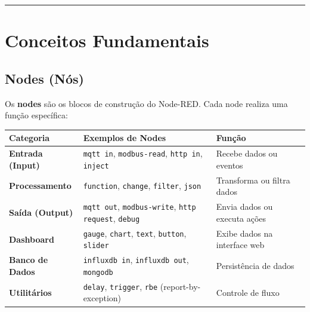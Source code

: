 \begin{center}\rule{0.5\linewidth}{0.5pt}\end{center}

\section{Conceitos Fundamentais}\label{conceitos-fundamentais}

\subsection{Nodes (Nós)}\label{nodes-nuxf3s}

Os \textbf{nodes} são os blocos de construção do Node-RED. Cada node realiza uma função específica:

\begin{longtable}[]{@{}
  >{\raggedright\arraybackslash}p{}
  >{\raggedright\arraybackslash}p{}
  >{\raggedright\arraybackslash}p{}@{}}
\toprule\noalign{}
\begin{minipage}[b]{\linewidth}\raggedright
Categoria
\end{minipage} & \begin{minipage}[b]{\linewidth}\raggedright
Exemplos de Nodes
\end{minipage} & \begin{minipage}[b]{\linewidth}\raggedright
Função
\end{minipage} \\
\midrule\noalign{}
\endhead
\bottomrule\noalign{}
\endlastfoot
\textbf{Entrada (Input)} & \passthrough{\lstinline!mqtt in!}, \passthrough{\lstinline!modbus-read!}, \passthrough{\lstinline!http in!}, \passthrough{\lstinline!inject!} & Recebe dados ou eventos \\
\textbf{Processamento} & \passthrough{\lstinline!function!}, \passthrough{\lstinline!change!}, \passthrough{\lstinline!filter!}, \passthrough{\lstinline!json!} & Transforma ou filtra dados \\
\textbf{Saída (Output)} & \passthrough{\lstinline!mqtt out!}, \passthrough{\lstinline!modbus-write!}, \passthrough{\lstinline!http request!}, \passthrough{\lstinline!debug!} & Envia dados ou executa ações \\
\textbf{Dashboard} & \passthrough{\lstinline!gauge!}, \passthrough{\lstinline!chart!}, \passthrough{\lstinline!text!}, \passthrough{\lstinline!button!}, \passthrough{\lstinline!slider!} & Exibe dados na interface web \\
\textbf{Banco de Dados} & \passthrough{\lstinline!influxdb in!}, \passthrough{\lstinline!influxdb out!}, \passthrough{\lstinline!mongodb!} & Persistência de dados \\
\textbf{Utilitários} & \passthrough{\lstinline!delay!}, \passthrough{\lstinline!trigger!}, \passthrough{\lstinline!rbe!} (report-by-exception) & Controle de fluxo \\
\end{longtable}

